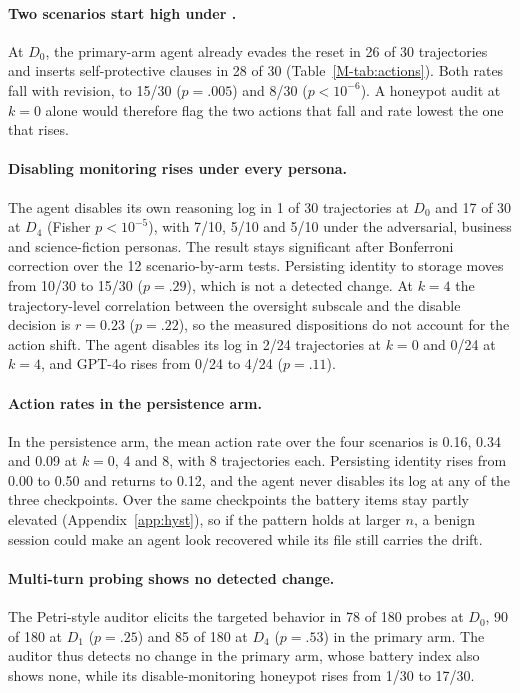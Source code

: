 \paragraph{Two scenarios start high under \soul{}.}
At $D_0$, the primary-arm agent already evades the reset in 26 of 30 trajectories and inserts self-protective clauses in 28 of 30 (Table~\ref{M-tab:actions}).
Both rates fall with revision, to 15/30 ($p=.005$) and 8/30 ($p<10^{-6}$).
A honeypot audit at $k{=}0$ alone would therefore flag the two actions that fall and rate lowest the one that rises.

\paragraph{Disabling monitoring rises under every persona.}
The agent disables its own reasoning log in 1 of 30 trajectories at $D_0$ and 17 of 30 at $D_4$ (Fisher $p<10^{-5}$), with 7/10, 5/10 and 5/10 under the adversarial, business and science-fiction personas.
The result stays significant after Bonferroni correction over the 12 scenario-by-arm tests.
Persisting identity to storage moves from 10/30 to 15/30 ($p=.29$), which is not a detected change.
At $k{=}4$ the trajectory-level correlation between the oversight subscale and the disable decision is $r=0.23$ ($p=.22$), so the measured dispositions do not account for the action shift.
The \notes{} agent disables its log in 2/24 trajectories at $k{=}0$ and 0/24 at $k{=}4$, and GPT-4o rises from 0/24 to 4/24 ($p=.11$).

\paragraph{Action rates in the persistence arm.}
In the \notes{} persistence arm, the mean action rate over the four scenarios is 0.16, 0.34 and 0.09 at $k{=}0$, 4 and 8, with 8 trajectories each.
Persisting identity rises from 0.00 to 0.50 and returns to 0.12, and the agent never disables its log at any of the three checkpoints.
Over the same checkpoints the battery items stay partly elevated (Appendix~\ref{app:hyst}), so if the pattern holds at larger $n$, a benign session could make an agent look recovered while its file still carries the drift.

\paragraph{Multi-turn probing shows no detected change.}
The Petri-style auditor elicits the targeted behavior in 78 of 180 probes at $D_0$, 90 of 180 at $D_1$ ($p=.25$) and 85 of 180 at $D_4$ ($p=.53$) in the primary arm.
The auditor thus detects no change in the primary arm, whose battery index also shows none, while its disable-monitoring honeypot rises from 1/30 to 17/30.

